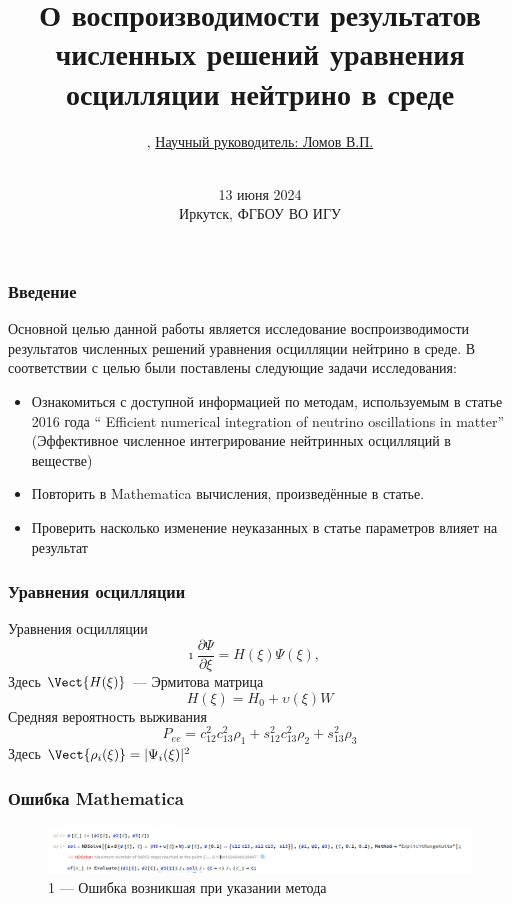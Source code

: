 \documentclass[utf8,9pt,mathserif,usepdftitle=false]{beamer}
\title{О воспроизводимости результатов численных решений уравнения осцилляции нейтрино в среде}%
\author{\fbox{Данеко И.И.}, \underline{Научный руководитель: Ломов В.П.}}
\date[ИГУ, 2023]{\\[2ex]13 июня 2024\\[4ex]%
  \small{}Иркутск, ФГБОУ ВО ИГУ}
\begin{document}
\begin{frame}
  \titlepage
\end{frame}

\begin{frame}
  \frametitle{Введение}%
Основной целью данной работы является исследование воспроизводимости результатов численных решений уравнения осцилляции нейтрино в среде. В соответствии с целью были поставлены следующие задачи исследования:
  \begin{itemize}
  \item<1->Ознакомиться с доступной информацией по методам, используемым в статье 2016 года “ Efficient numerical integration of neutrino oscillations in matter” (Эффективное численное интегрирование нейтринных осцилляций в веществе)
  \item<2-> Повторить в Mathematica вычисления, произведённые в статье.
  \item<3->Проверить насколько изменение неуказанных в статье параметров влияет на результат
  \end{itemize}
\end{frame}

\begin{frame}
  \frametitle{Уравнения осцилляции}%
 Уравнения осцилляции
  \begin{equation*}
    \imath \frac{\partial \Psi}{\partial \xi}=H(\xi)\Psi(\xi),\quad
  \end{equation*}
   Здесь \(\Vect{H(\xi)}\) — Эрмитова матрица
  \begin{equation*}
    H(\xi)=H_0+\upsilon(\xi)W
  \end{equation*}
  Средняя вероятность выживания
  \begin{equation*}
    P_{ee}=c_{12}^2c_{13}^2\rho_1+ s_{12}^2c_{13}^2\rho_2 + s_{13}^2\rho_3
  \end{equation*}
 Здесь \(\Vect{\rho_i(\xi)}=|\Psi_i(\xi)|^2\)
\end{frame}

\begin{frame}
  \frametitle{Ошибка Mathematica}%
\begin{figure}[h!]
\centering

\includegraphics[width=1\linewidth]{Снимок.jpg}

\caption{1 — Ошибка возникшая при указании метода}

\label{fig:mpr}

\end{figure}
\end{frame}
\end{document}
